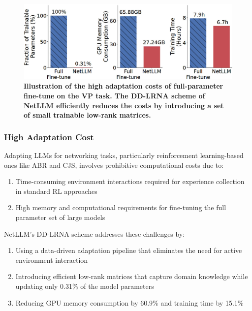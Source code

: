 \documentclass[twocolumn]{article}
\begin{document}
\begin{figure}[t]
  \centering
  \includegraphics[width=1\linewidth]{img/figure4.jpg}
  \caption{\textbf{Illustration of the high adaptation costs of full-parameter fine-tune on the VP task. The DD-LRNA scheme of NetLLM efficiently reduces the costs by introducing a set of small trainable low-rank matrices.}}
  \label{fig:4}
\end{figure}

\subsubsection{High Adaptation Cost}
Adapting LLMs for networking tasks, particularly reinforcement learning-based ones like ABR and CJS, involves prohibitive computational costs due to:

\begin{enumerate}[itemsep=0pt, topsep=2pt, parsep=0pt]
  \item Time-consuming environment interactions required for experience collection in standard RL approaches
  \item High memory and computational requirements for fine-tuning the full parameter set of large models
\end{enumerate}



NetLLM's DD-LRNA scheme addresses these challenges by:
\begin{enumerate}[itemsep=0pt, topsep=2pt, parsep=0pt]
  \item Using a data-driven adaptation pipeline that eliminates the need for active environment interaction
  \item Introducing efficient low-rank matrices that capture domain knowledge while updating only 0.31\% of the model parameters
  \item Reducing GPU memory consumption by 60.9\% and training time by 15.1\%
\end{enumerate}
\end{document}
